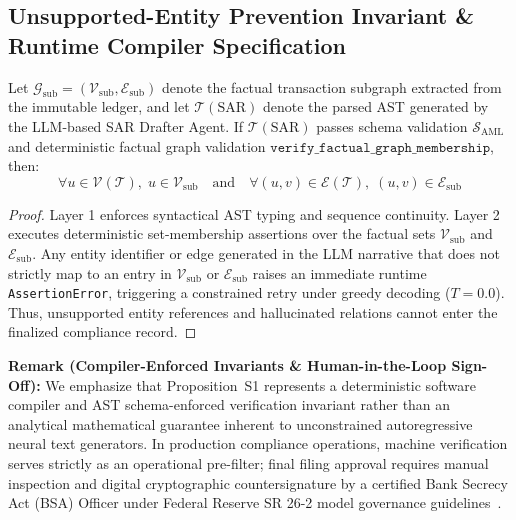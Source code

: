 \subsection{Unsupported-Entity Prevention Invariant \& Runtime Compiler Specification}
\begin{proposition}
Let $\mathcal{G}_{\text{sub}} = (\mathcal{V}_{\text{sub}}, \mathcal{E}_{\text{sub}})$ denote the factual transaction subgraph extracted from the immutable ledger, and let $\mathcal{T}(\text{SAR})$ denote the parsed AST generated by the LLM-based SAR Drafter Agent. If $\mathcal{T}(\text{SAR})$ passes schema validation $\mathcal{S}_{\text{AML}}$ and deterministic factual graph validation $\texttt{verify\_factual\_graph\_membership}$, then:
\begin{equation}
\forall u \in \mathcal{V}(\mathcal{T}), \; u \in \mathcal{V}_{\text{sub}} \quad \text{and} \quad \forall (u, v) \in \mathcal{E}(\mathcal{T}), \; (u, v) \in \mathcal{E}_{\text{sub}}
\end{equation}
\end{proposition}
\begin{proof}
Layer 1 enforces syntactical AST typing and sequence continuity. Layer 2 executes deterministic set-membership assertions over the factual sets $\mathcal{V}_{\text{sub}}$ and $\mathcal{E}_{\text{sub}}$. Any entity identifier or edge generated in the LLM narrative that does not strictly map to an entry in $\mathcal{V}_{\text{sub}}$ or $\mathcal{E}_{\text{sub}}$ raises an immediate runtime \texttt{AssertionError}, triggering a constrained retry under greedy decoding ($T=0.0$). Thus, unsupported entity references and hallucinated relations cannot enter the finalized compliance record.
\end{proof}
\textbf{Remark (Compiler-Enforced Invariants \& Human-in-the-Loop Sign-Off):} We emphasize that Proposition~S1 represents a deterministic software compiler and AST schema-enforced verification invariant rather than an analytical mathematical guarantee inherent to unconstrained autoregressive neural text generators. In production compliance operations, machine verification serves strictly as an operational pre-filter; final filing approval requires manual inspection and digital cryptographic countersignature by a certified Bank Secrecy Act (BSA) Officer under Federal Reserve SR 26-2 model governance guidelines~\cite{fed2026sr262}.
